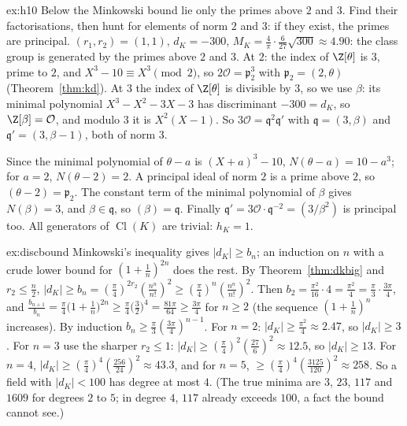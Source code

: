 \begin{solution}{ex:h10}
\idea Below the Minkowski bound lie only the primes above $2$ and $3$. Find their factorisations, then hunt for elements
of norm $2$ and $3$: if they exist, the primes are principal.
\writeup $(r_1,r_2)=(1,1)$, $d_K=-300$, $M_K=\frac4\pi\cdot\frac6{27}\sqrt{300}\approx4.90$: the class group is generated
by the primes above $2$ and $3$. At $2$: the index of $\Z[\theta]$ is $3$, prime to $2$, and $X^3-10\equiv X^3\pmod2$, so
$2\mathcal O=\mathfrak p_2^3$ with $\mathfrak p_2=(2,\theta)$ (Theorem~\ref{thm:kd}). At $3$ the index of $\Z[\theta]$ is
divisible by $3$, so we use $\beta$: its minimal polynomial $X^3-X^2-3X-3$ has discriminant $-300=d_K$, so
$\Z[\beta]=\mathcal O$, and modulo $3$ it is $X^2(X-1)$. So $3\mathcal O=\mathfrak q^2\mathfrak q'$ with $\mathfrak
q=(3,\beta)$ and $\mathfrak q'=(3,\beta-1)$, both of norm $3$.

Since the minimal polynomial of $\theta-a$ is $(X+a)^3-10$, $N(\theta-a)=10-a^3$; for $a=2$, $N(\theta-2)=2$. A principal
ideal of norm $2$ is a prime above $2$, so $(\theta-2)=\mathfrak p_2$. The constant term of the minimal polynomial of
$\beta$ gives $N(\beta)=3$, and $\beta\in\mathfrak q$, so $(\beta)=\mathfrak q$. Finally $\mathfrak q'=3\mathcal O\cdot
\mathfrak q^{-2}=(3/\beta^2)$ is principal too. All generators of $\operatorname{Cl}(K)$ are trivial: $h_K=1$.
\end{solution}

\begin{solution}{ex:discbound}
\idea Minkowski's inequality gives $|d_K|\ge b_n$; an induction on $n$ with a crude lower bound for $(1+\frac1n)^{2n}$
does the rest.
\writeup By Theorem~\ref{thm:dkbig} and $r_2\le\frac n2$, $|d_K|\ge b_n=(\frac\pi4)^{2r_2}(\frac{n^n}{n!})^2\ge(\frac\pi4)^n
(\frac{n^n}{n!})^2$. Then $b_2=\frac{\pi^2}{16}\cdot4=\frac{\pi^2}4=\frac\pi3\cdot\frac{3\pi}4$, and $\frac{b_{n+1}}{b_n}=
\frac\pi4\bigl(1+\frac1n\bigr)^{2n}\ge\frac\pi4\bigl(\frac32\bigr)^4=\frac{81\pi}{64}\ge\frac{3\pi}4$ for $n\ge2$ (the
sequence $(1+\frac1n)^n$ increases). By induction $b_n\ge\frac\pi3(\frac{3\pi}4)^{n-1}$. For $n=2$: $|d_K|\ge\frac{\pi^2}4
\approx2.47$, so $|d_K|\ge3$. For $n=3$ use the sharper $r_2\le1$: $|d_K|\ge(\frac\pi4)^2(\frac{27}6)^2\approx12.5$, so
$|d_K|\ge13$. For $n=4$, $|d_K|\ge(\frac\pi4)^4(\frac{256}{24})^2\approx43.3$, and for $n=5$, $\ge(\frac\pi4)^4(\frac{3125}
{120})^2\approx258$. So a field with $|d_K|<100$ has degree at most $4$. (The true minima are $3$, $23$, $117$ and $1609$
for degrees $2$ to $5$; in degree $4$, $117$ already exceeds $100$, a fact the bound cannot see.)
\end{solution}

